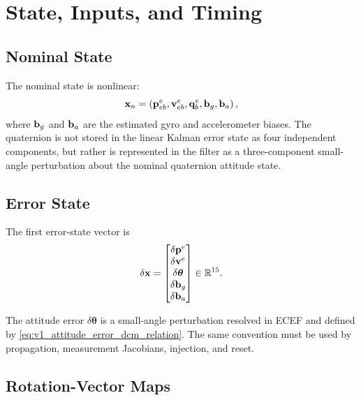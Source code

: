 \chapter{State, Inputs, and Timing}

\section{Nominal State}

The nominal state is nonlinear:
\begin{equation}
\mathbf{x}_n =
\left(
\mathbf{p}_{eb}^{e},
\mathbf{v}_{eb}^{e},
\mathbf{q}_b^e,
\mathbf{b}_g,
\mathbf{b}_a
\right),
\end{equation}
where $\mathbf{b}_g$ and $\mathbf{b}_a$ are the estimated gyro and accelerometer biases. The
quaternion is not stored in the linear Kalman error state as four independent
components, but rather is represented in the filter as a three-component
small-angle perturbation about the nominal quaternion attitude state.

\section{Error State}

The first error-state vector is
\begin{equation}
\delta\mathbf{x} =
\begin{bmatrix}
\delta\mathbf{p}^{e}\\
\delta\mathbf{v}^{e}\\
\delta\boldsymbol{\theta}\\
\delta\mathbf{b}_g\\
\delta\mathbf{b}_a
\end{bmatrix}
\in \mathbb{R}^{15}.
\end{equation}

The attitude error $\delta\boldsymbol{\theta}$ is a small-angle perturbation
resolved in ECEF and defined by \cref{eq:v1_attitude_error_dcm_relation}. The
same convention must be used by propagation, measurement Jacobians, injection,
and reset.

\section{Rotation-Vector Maps}

